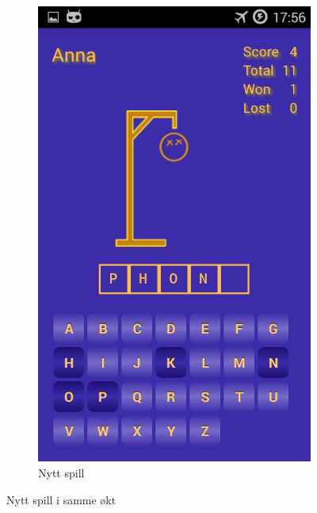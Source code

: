 \begin{figure}[ht]
\begin{subfigure}[b]{0.3\textwidth}
        \includegraphics[width=\textwidth]{./img/bruksanvisning/6.png}
        \caption{Nytt spill}
        \label{fig:nyt_spill_samme_okt}
    \end{subfigure}
    \caption{Nytt spill i samme økt}\label{fig:new_game_activities}
\end{figure}


